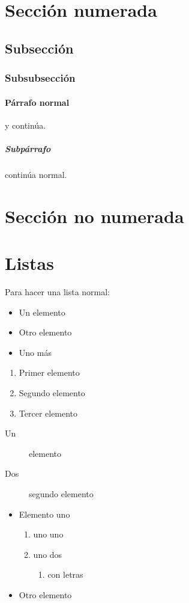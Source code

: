 \section{Sección numerada}

\subsection{Subsección}

\subsubsection{Subsubsección}

\paragraph{Párrafo normal} y continúa.

\subparagraph{Subpárrafo} continúa normal.

\section*{Sección no numerada}

\section{Listas}
\label{ssec:listas}

Para hacer una lista normal:

\begin{itemize}
	\item Un elemento
	\item Otro elemento
	\item Uno más
\end{itemize}

\begin{enumerate}
	\item Primer elemento
	\item Segundo elemento
	\item Tercer elemento
\end{enumerate}

\begin{description}
	\item[Un] elemento
	\item[Dos] segundo elemento
\end{description}

\begin{itemize}
	\item Elemento uno
	\begin{enumerate}
		\item uno uno
		\item uno dos
		\begin{enumerate}
			\item con letras
		\end{enumerate}
	\end{enumerate}
	\item Otro elemento
\end{itemize}


